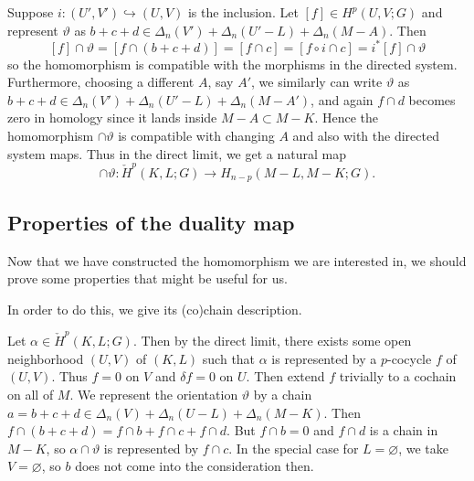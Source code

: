 \documentclass[reqno]{amsart}
\theoremstyle{definition}
\theoremstyle{remark}
\begin{document}
    Suppose $i \colon \left( U',V' \right) \hookrightarrow 
    \left( U,V \right) $ is the inclusion. Let
    $\left[ f \right] \in 
    H^{p}\left( U,V;G \right) $ and
     represent $\vartheta$ as
     $b+c+d \in \Delta_n (V') + \Delta_n (U' - L) +
     \Delta_n (M-A)$. Then
     \[
     \left[ f \right] \cap \vartheta
     = \left[ f \cap \left( b + c+ d \right)  \right] 
     = \left[ f \cap c \right] 
     = \left[ f \circ i \cap c \right] 
     = i^{*} \left[ f \right] \cap
     \vartheta
     \] 
     so the homomorphism is compatible with the morphisms
     in the directed system. Furthermore, choosing a different
     $A$, say $A'$, we similarly can write
     $\vartheta$ as
     $b+c+d \in \Delta_n (V') + \Delta_n (U'-L) + \Delta_n (M-A')$, and
     again $f \cap d$ becomes zero in homology
     since it lands inside $M - A \subset M - K$.
     Hence the homomorphism
      $\cap \vartheta$ is compatible with changing $A$ and
      also with the directed system maps. Thus
      in the direct limit, we get a natural map
      \[
      \cap \vartheta \colon
      \check{H}^{p} (K,L;G) \to H_{n-p} (M-L, M-K;G).
      \] 


      \subsection{Properties of the duality map}

      Now that we have constructed the homomorphism
      we are interested in, we should prove some properties
      that might be useful for us.

      In order to do this, we give its (co)chain description.

      Let $\alpha \in \check{H}^{p}(K,L;G)$. Then
      by the direct limit, there exists
      some open neighborhood $(U,V)$ of $(K,L)$ such that
      $\alpha$ is represented by a 
      $p$-cocycle $f$ of $(U,V)$.
      Thus $f = 0$ on $V$ and
      $\delta f = 0$ on $U$.
      Then extend $f$ trivially to a cochain on all of $M$.
      We represent the orientation
      $\vartheta$ by a chain $a = b+c+d \in 
      \Delta_n (V) + \Delta_n (U-L) + \Delta_n (M-K)$.
      Then $f \cap \left( b+c+d \right) = 
      f \cap b + f \cap c + f \cap d$. But
      $f \cap b = 0$ and
      $f \cap d$ is a chain in $M - K$, so
      $\alpha \cap \vartheta$ is represented by
      $f \cap c$. In the special case for
      $L = \varnothing$, we take $V = \varnothing$, so
      $b$ does not come into the consideration then.\\
\end{document}
